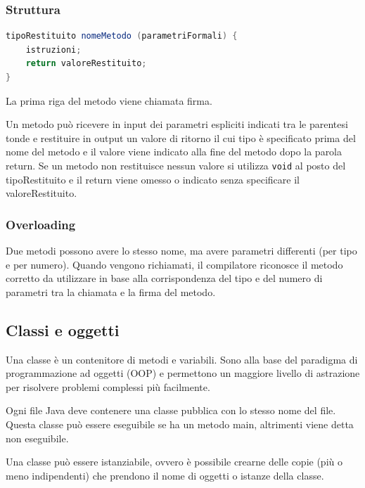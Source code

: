 \documentclass[a4paper]{article}
\begin{document}
\subsubsection*{Struttura}
\begin{lstlisting}[language=Java]
tipoRestituito nomeMetodo (parametriFormali) {
	istruzioni;
	return valoreRestituito;
}
\end{lstlisting}

La prima riga del metodo viene chiamata firma.

Un metodo può ricevere in input dei parametri espliciti indicati tra le parentesi tonde e restituire in output un valore di ritorno
il cui tipo è specificato prima del nome del metodo e il valore viene indicato alla fine del metodo dopo la parola return.
Se un metodo non restituisce nessun valore si utilizza \verb|void| al posto del tipoRestituito e il return viene omesso o 
indicato senza specificare il valoreRestituito.

\subsubsection*{Overloading}
Due metodi possono avere lo stesso nome, ma avere parametri differenti (per tipo e per numero). Quando vengono richiamati, il
compilatore riconosce il metodo corretto da utilizzare in base alla corrispondenza del tipo e del numero di parametri tra la chiamata
e la firma del metodo.


\subsection{Classi e oggetti}
Una classe è un contenitore di metodi e variabili. Sono alla base del paradigma di programmazione ad oggetti (OOP) e permettono
un maggiore livello di astrazione per risolvere problemi complessi più facilmente.

Ogni file Java deve contenere una classe pubblica con lo stesso nome del file. Questa classe può essere eseguibile se ha un metodo
main, altrimenti viene detta non eseguibile.

Una classe può essere istanziabile, ovvero è possibile crearne delle copie (più o meno indipendenti) che prendono il nome di oggetti
o istanze della classe.
\end{document}
